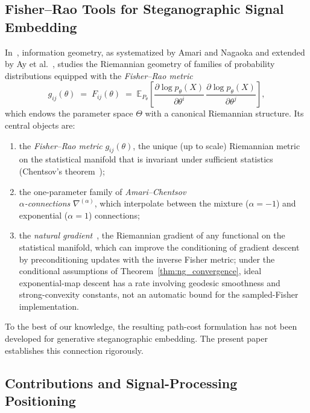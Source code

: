 \documentclass[a4paper,fleqn]{cas-dc}
\newcommand{\E}{\mathbb{E}}
\begin{document}
\subsection{Fisher--Rao Tools for Steganographic Signal Embedding}

In~\cite{amari2000methods}, information geometry, as systematized by Amari and
Nagaoka and extended by Ay et al.~\cite{ay2017information}, studies the
Riemannian geometry of families of probability distributions equipped with the
\emph{Fisher--Rao metric}
\begin{equation}
  g_{ij}(\theta) \;=\; F_{ij}(\theta)
  \;=\; \E_{P_\theta}\!\left[
    \frac{\partial \log p_\theta(X)}{\partial\theta^i}\,
    \frac{\partial \log p_\theta(X)}{\partial\theta^j}
  \right],
  \label{eq:fisher_rao_intro}
\end{equation}
which endows the parameter space $\Theta$ with a canonical Riemannian structure.
Its central objects are:
\begin{enumerate}
  \item the \emph{Fisher--Rao metric} $g_{ij}(\theta)$, the unique (up to
        scale) Riemannian metric on the statistical manifold that is invariant
        under sufficient statistics (Chentsov's theorem~\cite{chentsov1982statistical});
  \item the one-parameter family of \emph{Amari--Chentsov\\ $\alpha$-connections}
        $\nabla^{(\alpha)}$, which interpolate between the mixture
        ($\alpha=-1$) and exponential ($\alpha=1$) connections;
  \item the \emph{natural gradient}~\cite{amari1998natural}, the
        Riemannian gradient of any functional on the statistical manifold,
        which can improve the conditioning of gradient descent by preconditioning
updates with the inverse Fisher metric; under the conditional assumptions of
Theorem~\ref{thm:ng_convergence}, ideal exponential-map descent has a
rate involving geodesic smoothness and strong-convexity constants,
not an automatic bound for the sampled-Fisher implementation.
\end{enumerate}
To the best of our knowledge, the resulting path-cost formulation has not been
developed for generative steganographic embedding.
The present paper establishes this connection rigorously.

\subsection{Contributions and Signal-Processing Positioning}
\end{document}
